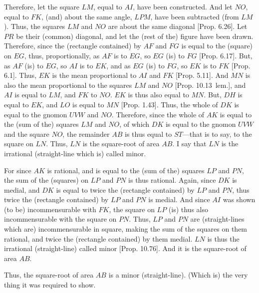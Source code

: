 \begin{Parallel}{}{}
{Therefore, let the square $LM$, equal  to $AI$, have been constructed. And let $NO$, equal to $FK$, (and) about the same angle, $LPM$,  have been subtracted (from $LM$). Thus, the squares $LM$ and $NO$ are about the
same diagonal [Prop. 6.26]. Let $PR$ be their (common) diagonal, and let the (rest of the) figure have been drawn. Therefore, since
the (rectangle contained) by $AF$ and $FG$ is equal to the (square) on $EG$, thus, proportionally, as $AF$ is to $EG$, so $EG$ (is) to $FG$
[Prop. 6.17]. 
But, as $AF$ (is) to $EG$, so
$AI$ is to $EK$, and as $EG$ (is) to $FG$, so $EK$ is to $FK$ [Prop. 6.1]. Thus, $EK$ is the mean proportional to
$AI$ and $FK$ [Prop. 5.11]. And $MN$ is also the mean proportional to the squares $LM$
and $NO$ [Prop. 10.13~lem.], and $AI$ is equal to $LM$, and $FK$ to $NO$. $EK$ is thus also equal to $MN$. But, $DH$ is equal to $EK$, and $LO$ is equal to $MN$ [Prop. 1.43]. 
Thus, the whole of $DK$ is equal to the gnomon $UVW$ and $NO$.
Therefore, since the whole of $AK$ is equal to the (sum of the) squares $LM$ and
$NO$, of which $DK$ is equal to the gnomon $UVW$ and the square
$NO$, the remainder $AB$ is thus equal to $ST$---that is to say, to the
square on $LN$. Thus, $LN$ is the square-root of area $AB$. I say
that $LN$ is the irrational (straight-line which is) called minor.

For since $AK$ is rational, and is equal to the (sum of the) squares $LP$ and $PN$,
the sum of the (squares) on $LP$ and $PN$ is thus rational. Again, since
$DK$ is medial, and $DK$ is equal to twice the (rectangle contained)
by $LP$ and $PN$, thus twice the (rectangle contained) by $LP$
and $PN$ is medial. And since $AI$ was shown (to be) incommensurable
with $FK$, the square on $LP$ (is) thus also incommensurable with
the square on $PN$. Thus, $LP$ and $PN$ are (straight-lines which are) incommensurable in square,
making the sum of the squares on them rational, and twice the (rectangle
contained) by them medial. $LN$ is thus the irrational (straight-line)
called minor [Prop. 10.76]. And it is
the square-root of area $AB$.

Thus, the square-root of area $AB$ is a minor (straight-line). (Which is)
the very thing it was required to show.}
\end{Parallel}

